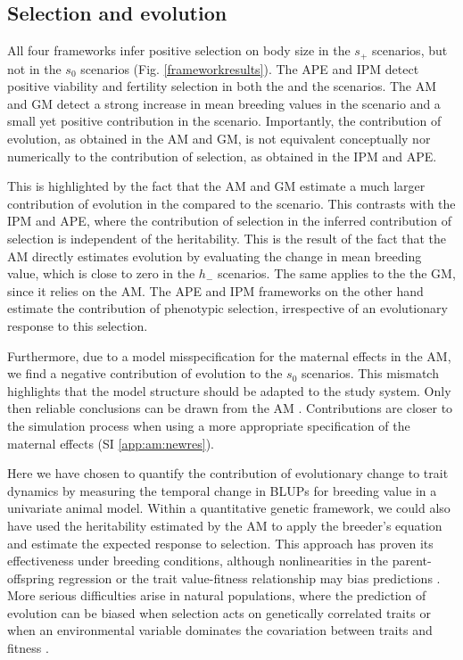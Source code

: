 \subsection*{Selection and evolution}
All four frameworks infer positive selection on body size in the $s_+$ scenarios, but not in the $s_0$ scenarios (Fig. \ref{frameworkresults}). The APE and IPM detect positive viability and fertility selection in both the \SH and the \Sh scenarios. The AM and GM detect a strong increase in mean breeding values in the \SH scenario and a small yet positive contribution in the \Sh scenario. Importantly, the contribution of evolution, as obtained in the AM and GM, is not equivalent conceptually nor numerically to the contribution of selection, as obtained in the IPM and APE.

This is highlighted by the fact that the AM and GM estimate a much larger contribution of evolution in the \SH compared to the \Sh scenario. This contrasts with the IPM and APE, where the contribution of selection in the inferred contribution of selection is independent of the heritability. This is the result of the fact that the AM directly estimates evolution by evaluating the change in mean breeding value, which is close to zero in the $h_-$ scenarios. The same applies to the the GM, since it relies on the AM. The APE and IPM frameworks on the other hand estimate the contribution of phenotypic selection, irrespective of an evolutionary response to this selection.

Furthermore, due to a model misspecification for the maternal effects in the AM, we find a negative contribution of evolution to the $s_0$ scenarios. This mismatch highlights that the model structure should be adapted to the study system. Only then reliable conclusions can be drawn from the AM \parencite[see also][]{Hadfield2011}. 
Contributions are closer to the simulation process when using a more appropriate specification of the maternal effects (SI \ref{app:am:newres}). 

Here we have chosen to quantify the contribution of evolutionary change to trait dynamics by measuring the temporal change in BLUPs for breeding value in a univariate animal model. Within a quantitative genetic framework, we could also have used the heritability estimated by the AM to apply the breeder's equation and estimate the expected response to selection. This approach has proven its effectiveness under breeding conditions, although nonlinearities in the parent-offspring regression or the trait value-fitness relationship may bias predictions \parencite{Heywood2005}. More serious difficulties arise in natural populations, where the prediction of evolution can be biased when selection acts on genetically correlated traits or when an environmental variable dominates the covariation between traits and fitness \parencite{Rausher1992,Morrissey2010}.

